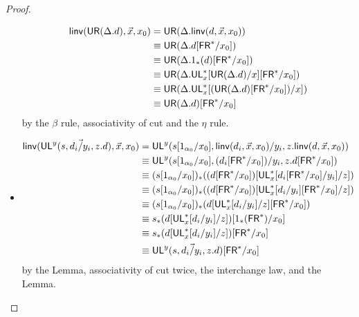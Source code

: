 \begin{proof}
\begin{itemize}
\begin{align*}
\mathsf{linv}(\mathsf{UR}(\Delta.d),\vec{x},x_0) 
&= \mathsf{UR}(\Delta.\mathsf{linv}(d,\vec{x},x_0)) \\
&\equiv \mathsf{UR}(\Delta.d[\mathsf{FR}^*/x_0]) \\
&\equiv \mathsf{UR}(\Delta.1_*(d)[\mathsf{FR}^*/x_0]) \\
&\equiv \mathsf{UR}(\Delta.\mathsf{UL}^*_{x}[\mathsf{UR}(\Delta.d)/x][\mathsf{FR}^*/x_0]) \\
&\equiv \mathsf{UR}(\Delta.\mathsf{UL}^*_{x}[(\mathsf{UR}(\Delta.d)[\mathsf{FR}^*/x_0])/x])\\
&\equiv \mathsf{UR}(\Delta.d)[\mathsf{FR}^*/x_0]
\end{align*}
by the $\beta$ rule, associativity of cut and the $\eta$ rule.
\item \begin{align*}
\mathsf{linv}(\mathsf{UL}^{y}_{}(s,\vec{d_i/y_i},z.d),\vec{x},x_0) 
&= \mathsf{UL}^{y}_{}(s[1_{\alpha_0}/x_0],\mathsf{linv}(d_i,\vec{x},x_0)/y_i,z.\mathsf{linv}(d,\vec{x},x_0)) \\
&\equiv \mathsf{UL}^{y}_{}(s[1_{\alpha_0}/x_0],(d_i[\mathsf{FR}^*/x_0])/y_i,z.d[\mathsf{FR}^*/x_0]) \\
&\equiv (s[1_{\alpha_0}/x_0])_*((d[\mathsf{FR}^*/x_0])[\mathsf{UL}^*_{x}[d_i[\mathsf{FR}^*/x_0]/y_i]/z]) \\
&\equiv (s[1_{\alpha_0}/x_0])_*((d[\mathsf{FR}^*/x_0])[\mathsf{UL}^*_{x}[d_i/y_i][\mathsf{FR}^*/x_0]/z]) \\
&\equiv (s[1_{\alpha_0}/x_0])_*(d[\mathsf{UL}^*_{x}[d_i/y_i]/z][\mathsf{FR}^*/x_0]) \\
&\equiv s_*(d[\mathsf{UL}^*_{x}[d_i/y_i]/z])[1_*(\mathsf{FR}^*)/x_0] \\
&\equiv s_*(d[\mathsf{UL}^*_{x}[d_i/y_i]/z])[\mathsf{FR}^*/x_0] \\
&\equiv \mathsf{UL}^{y}_{}(s,\vec{d_i/y_i},z.d)[\mathsf{FR}^*/x_0]
\end{align*}
by the Lemma, associativity of cut twice, the interchange law, and the Lemma.
\end{itemize}



\end{proof}
